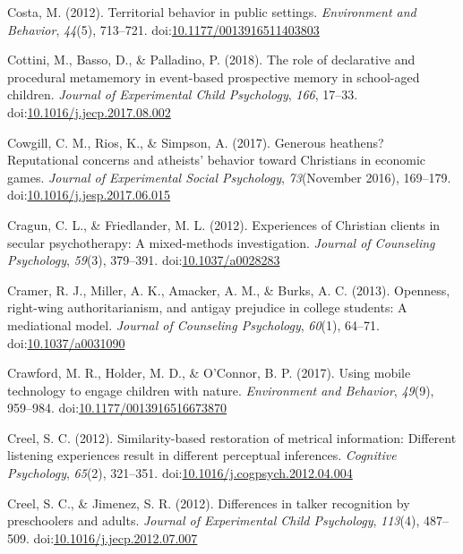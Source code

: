 \documentclass[english,man]{apa6}
\begin{document}
\hypertarget{ref-Costa2012}{}
Costa, M. (2012). Territorial behavior in public settings.
\emph{Environment and Behavior}, \emph{44}(5), 713--721.
doi:\href{https://doi.org/10.1177/0013916511403803}{10.1177/0013916511403803}

\hypertarget{ref-Cottini2018}{}
Cottini, M., Basso, D., \& Palladino, P. (2018). The role of declarative
and procedural metamemory in event-based prospective memory in
school-aged children. \emph{Journal of Experimental Child Psychology},
\emph{166}, 17--33.
doi:\href{https://doi.org/10.1016/j.jecp.2017.08.002}{10.1016/j.jecp.2017.08.002}

\hypertarget{ref-Cowgill2017}{}
Cowgill, C. M., Rios, K., \& Simpson, A. (2017). Generous heathens?
Reputational concerns and atheists' behavior toward Christians in
economic games. \emph{Journal of Experimental Social Psychology},
\emph{73}(November 2016), 169--179.
doi:\href{https://doi.org/10.1016/j.jesp.2017.06.015}{10.1016/j.jesp.2017.06.015}

\hypertarget{ref-Cragun2012}{}
Cragun, C. L., \& Friedlander, M. L. (2012). Experiences of Christian
clients in secular psychotherapy: A mixed-methods investigation.
\emph{Journal of Counseling Psychology}, \emph{59}(3), 379--391.
doi:\href{https://doi.org/10.1037/a0028283}{10.1037/a0028283}

\hypertarget{ref-Cramer2013}{}
Cramer, R. J., Miller, A. K., Amacker, A. M., \& Burks, A. C. (2013).
Openness, right-wing authoritarianism, and antigay prejudice in college
students: A mediational model. \emph{Journal of Counseling Psychology},
\emph{60}(1), 64--71.
doi:\href{https://doi.org/10.1037/a0031090}{10.1037/a0031090}

\hypertarget{ref-Crawford2017}{}
Crawford, M. R., Holder, M. D., \& O'Connor, B. P. (2017). Using mobile
technology to engage children with nature. \emph{Environment and
Behavior}, \emph{49}(9), 959--984.
doi:\href{https://doi.org/10.1177/0013916516673870}{10.1177/0013916516673870}

\hypertarget{ref-Creel2012a}{}
Creel, S. C. (2012). Similarity-based restoration of metrical
information: Different listening experiences result in different
perceptual inferences. \emph{Cognitive Psychology}, \emph{65}(2),
321--351.
doi:\href{https://doi.org/10.1016/j.cogpsych.2012.04.004}{10.1016/j.cogpsych.2012.04.004}

\hypertarget{ref-Creel2012}{}
Creel, S. C., \& Jimenez, S. R. (2012). Differences in talker
recognition by preschoolers and adults. \emph{Journal of Experimental
Child Psychology}, \emph{113}(4), 487--509.
doi:\href{https://doi.org/10.1016/j.jecp.2012.07.007}{10.1016/j.jecp.2012.07.007}
\end{document}
